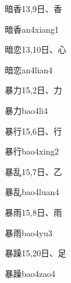 \begin{entry}{暗香}{13,9}{⽇、⾹}
  \begin{phonetics}{暗香}{an4xiang1}
  \end{phonetics}
\end{entry}

\begin{entry}{暗恋}{13,10}{⽇、⼼}
  \begin{phonetics}{暗恋}{an4lian4}
  \end{phonetics}
\end{entry}

\begin{entry}{暴力}{15,2}{⽇、⼒}
  \begin{phonetics}{暴力}{bao4li4}
  \end{phonetics}
\end{entry}

\begin{entry}{暴行}{15,6}{⽇、⾏}
  \begin{phonetics}{暴行}{bao4xing2}
  \end{phonetics}
\end{entry}

\begin{entry}{暴乱}{15,7}{⽇、⼄}
  \begin{phonetics}{暴乱}{bao4luan4}
  \end{phonetics}
\end{entry}

\begin{entry}{暴雨}{15,8}{⽇、⾬}
  \begin{phonetics}{暴雨}{bao4yu3}
  \end{phonetics}
\end{entry}

\begin{entry}{暴躁}{15,20}{⽇、⾜}
  \begin{phonetics}{暴躁}{bao4zao4}
  \end{phonetics}
\end{entry}


